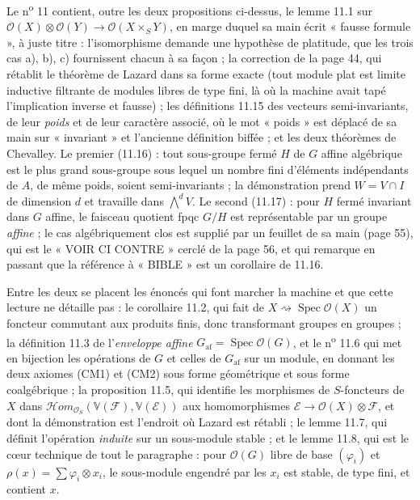 \documentclass[11pt,a4paper]{article}
\begin{document}
Le n\textsuperscript{o} 11 contient, outre les deux propositions ci-dessus, le
lemme 11.1 sur $\mathcal{O}(X) \otimes \mathcal{O}(Y) \to \mathcal{O}(X
\times_{S} Y)$, en marge duquel sa main écrit « fausse formule », à juste
titre : l'isomorphisme demande une hypothèse de platitude, que
les trois cas a), b), c) fournissent chacun à sa façon ; la correction de la
page 44, qui rétablit le théorème de Lazard dans sa forme exacte (tout
module plat est limite inductive filtrante de modules libres de type fini, là
où la machine avait tapé l'implication inverse et fausse) ; les définitions
11.15 des vecteurs semi-invariants, de leur \emph{poids} et de leur caractère
associé, où le mot « poids » est déplacé de sa main sur « invariant » et
l'ancienne définition biffée ; et les deux théorèmes de Chevalley. Le premier
(11.16) : tout sous-groupe fermé $H$ de $G$ affine algébrique est le plus grand
sous-groupe sous lequel un nombre fini d'éléments indépendants de $A$, de même
poids, soient semi-invariants ; la démonstration prend $W = V \cap I$ de
dimension $d$ et travaille dans $\bigwedge^{d}V$. Le second (11.17) : pour $H$
fermé invariant dans $G$ affine, le faisceau quotient fpqc $G/H$ est
représentable par un groupe \emph{affine} ; le cas algébriquement clos est
supplié par un feuillet de sa main (page 55), qui est le « VOIR CI CONTRE »
cerclé de la page 56, et qui remarque en passant que la référence à
« BIBLE » est un corollaire de 11.16.

Entre les deux se placent les énoncés qui font marcher la machine et que cette
lecture ne détaille pas : le corollaire 11.2, qui fait de $X \rightsquigarrow
\operatorname{Spec}\mathcal{O}(X)$ un foncteur commutant aux produits finis,
donc transformant groupes en groupes ; la définition 11.3 de
l'\emph{enveloppe affine} $G_{\mathrm{af}} = \operatorname{Spec}
\mathcal{O}(G)$, et le n\textsuperscript{o} 11.6 qui met en bijection les
opérations de $G$ et celles de $G_{\mathrm{af}}$ sur un module, en donnant les
deux axiomes (CM1) et (CM2) sous forme géométrique et sous forme
coalgébrique ; la proposition 11.5, qui identifie les morphismes de
$S$-foncteurs de $X$ dans $\mathcal{H}om_{\mathcal{O}_{S}}
(\mathbb{V}(\mathcal{F}), \mathbb{V}(\mathcal{E}))$ aux homomorphismes
$\mathcal{E} \to \mathcal{O}(X) \otimes \mathcal{F}$, et dont la démonstration
est l'endroit où Lazard est rétabli ; le lemme 11.7, qui définit l'opération
\emph{induite} sur un sous-module stable ; et le lemme 11.8, qui est le cœur
technique de tout le paragraphe : pour $\mathcal{O}(G)$ libre de base
$(\varphi_{i})$ et $\rho(x) = \sum \varphi_{i} \otimes x_{i}$, le sous-module
engendré par les $x_{i}$ est stable, de type fini, et contient $x$.
\end{document}
